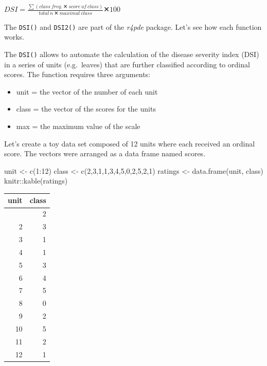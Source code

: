 \documentclass[
  letterpaper,
  DIV=11,
  numbers=noendperiod]{scrreprt}
\newenvironment{Shaded}{\begin{snugshade}}{\end{snugshade}}
\newcommand{\DecValTok}[1]{\textcolor[rgb]{0.68,0.00,0.00}{#1}}
\newcommand{\FunctionTok}[1]{\textcolor[rgb]{0.28,0.35,0.67}{#1}}
\newcommand{\NormalTok}[1]{\textcolor[rgb]{0.00,0.23,0.31}{#1}}
\newcommand{\OtherTok}[1]{\textcolor[rgb]{0.00,0.23,0.31}{#1}}
\newcommand{\SpecialCharTok}[1]{\textcolor[rgb]{0.37,0.37,0.37}{#1}}
\begin{document}
\(DSI = \frac{∑(class \ freq. \ ✕ \ score \  of \ class)} {total \ n \ ✕ \ maximal \ class} ✕ 100\)

The \texttt{DSI()} and \texttt{DSI2()} are part of the \emph{r4pde}
package. Let's see how each function works.

The \texttt{DSI()} allows to automate the calculation of the disease
severity index (DSI) in a series of units (e.g.~leaves) that are further
classified according to ordinal scores. The function requires three
arguments:

\begin{itemize}
\item
  unit = the vector of the number of each unit
\item
  class = the vector of the scores for the units
\item
  max = the maximum value of the scale
\end{itemize}

Let's create a toy data set composed of 12 units where each received an
ordinal score. The vectors were arranged as a data frame named scores.

\begin{Shaded}
\begin{Highlighting}[]
\NormalTok{unit }\OtherTok{\textless{}{-}} \FunctionTok{c}\NormalTok{(}\DecValTok{1}\SpecialCharTok{:}\DecValTok{12}\NormalTok{)}
\NormalTok{class }\OtherTok{\textless{}{-}} \FunctionTok{c}\NormalTok{(}\DecValTok{2}\NormalTok{,}\DecValTok{3}\NormalTok{,}\DecValTok{1}\NormalTok{,}\DecValTok{1}\NormalTok{,}\DecValTok{3}\NormalTok{,}\DecValTok{4}\NormalTok{,}\DecValTok{5}\NormalTok{,}\DecValTok{0}\NormalTok{,}\DecValTok{2}\NormalTok{,}\DecValTok{5}\NormalTok{,}\DecValTok{2}\NormalTok{,}\DecValTok{1}\NormalTok{)}
\NormalTok{ratings }\OtherTok{\textless{}{-}} \FunctionTok{data.frame}\NormalTok{(unit, class)}
\NormalTok{knitr}\SpecialCharTok{::}\FunctionTok{kable}\NormalTok{(ratings)}
\end{Highlighting}
\end{Shaded}

\begin{longtable}[]{@{}rr@{}}
\toprule\noalign{}
unit & class \\
\midrule\noalign{}
\endhead
\bottomrule\noalign{}
\endlastfoot
1 & 2 \\
2 & 3 \\
3 & 1 \\
4 & 1 \\
5 & 3 \\
6 & 4 \\
7 & 5 \\
8 & 0 \\
9 & 2 \\
10 & 5 \\
11 & 2 \\
12 & 1 \\
\end{longtable}
\end{document}
